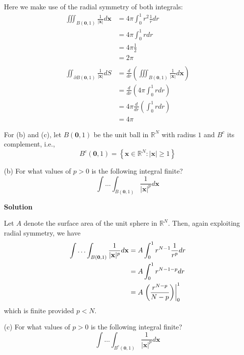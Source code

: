 \documentclass{article}
\begin{document}
Here we make use of the radial symmetry of both integrals:
%
\begin{align*}
    \iiint_{B(\mathbf{0},1)} \frac{1}{|\mathbf{x}|} d \mathbf{x}
        &= 4 \pi \int_0^1 r^2 \frac{1}{r} dr \\
        &= 4 \pi \int_0^1 r dr \\
        &= 4 \pi \frac{1}{2} \\
        &= 2 \pi \\
    \\
    \iint_{\partial B(\mathbf{0},1)} \frac{1}{|\mathbf{x}|} d S
        &= \frac{d}{dr} \left(
            \iiint_{B(\mathbf{0},1)} \frac{1}{|\mathbf{x}|} d \mathbf{x}
           \right) \\
        &= \frac{d}{dr} \left(4 \pi \int_0^1 r dr \right) \\
        &= 4 \pi \frac{d}{dr} \left(\int_0^1 r dr \right) \\
        &= 4 \pi
\end{align*}

\vspace{5mm}
For (b) and (c), let $B(\mathbf{0},1)$ be the unit ball in
$\mathbb{R}^{N}$ with radius $1$ and $B^{c}$ its complement, i.e.,
$$B^{c}(\mathbf{0}, 1) = \left\{\mathbf{x} \in \mathbb{R}^{N}: |\mathbf{x}| \geq 1 \right\}$$

(b) For what values of $p > 0$ is the following integral finite?
%
\begin{equation*}
    \int \ldots \int_{B(\mathbf{0}, 1)} \frac{1}{|\mathbf{x}|^{p}} d \mathbf{x}
\end{equation*}

\textbf{Solution}

Let $A$ denote the surface area of the unit sphere in $\mathbb{R}^{N}$.
Then, again exploiting radial symmetry, we have
%
\begin{align*}
    \int \ldots \int_{B(\mathbf{0}, 1)} \frac{1}{|\mathbf{x}|^{p}} d \mathbf{x}
        &= A \int_0^1 r^{N - 1} \frac{1}{r^p} dr \\
        &= A \int_0^1 r^{N - 1 - p} dr \\
        &= A \eval{\qty({\frac{r^{N - p}}{N - p}})}_0^1 \\
\end{align*}
%
which is finite provided $p < N$.

\vspace{5mm}
(c) For what values of $p > 0$ is the following integral finite?
%
\begin{equation*}
    \int \ldots \int_{B^{c}(\mathbf{0}, 1)} \frac{1}{|\mathbf{x}|^{p}} d \mathbf{x}
\end{equation*}
\end{document}
